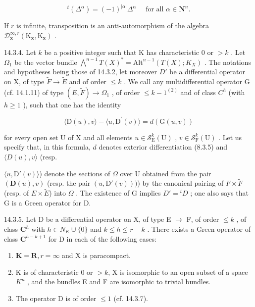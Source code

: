 \[
{ } ^ { t } ( \Delta ^ { \alpha } ) = ( - 1 ) ^ { | \alpha | } \Delta ^ { \alpha } \quad \text { for all } \alpha \in \mathbf {N} ^ { n } .
\]

If \(r\) is infinite, transposition is an anti-automorphism of the algebra \(\mathcal{D}_{\mathbf{x}}^{\infty,r}(\mathrm{K}_{\mathbf{x}},\mathrm{K}_{\mathbf{x}})\) .

14.3.4. Let \(k\) be a positive integer such that K has characteristic 0 or \(>k\) . Let \(\Omega_{1}\) be the vector bundle \(\bigwedge^{n-1}T(X)^{*} = \text{Alt}^{n-1}(T(X); K_{X})\) . The notations and hypotheses being those of 14.3.2, let moreover \(D'\) be a differential operator on X, of type \(\widetilde{F} \to \widetilde{E}\) and of order \(\leqslant k\) . We call any multidifferential operator G (cf. 14.1.11) of type \((E, \widetilde{F}) \to \Omega_{1}\) , of order \(\leqslant k - 1^{(2)}\) and of class \(C^{h}\) (with \(h \geqslant 1\) ), such that one has the identity

\[
\langle \mathrm{D} (u), v \rangle - \langle u, \mathrm{D} ^ {\prime} (v) \rangle = d (\mathrm{G} (u, v))\tag{1}
\]

for every open set U of X and all elements \(u \in \mathcal{S}_{\mathrm{E}}^{k}(\mathrm{U})\) , \(v \in \mathcal{S}_{\mathrm{F}}^{k}(\mathrm{U})\) . Let us specify that, in this formula, \(d\) denotes exterior differentiation (8.3.5) and \(\langle D(u), v \rangle\) (resp.

\(\langle u, \mathrm{D}'(v) \rangle\)) denote the sections of \(\Omega\) over U obtained from the pair \((\mathbf{D}(u), v)\) (resp. the pair \((u, \mathrm{D}'(v)))\)) by the canonical pairing of \(F \times \tilde{F}\) (resp. of \(E \times \tilde{E}\)) into \(\Omega\) . The existence of G implies \(D' = {}^t D\) ; one also says that G is a Green operator for D.

14.3.5. Let D be a differential operator on X, of type E \(\to\) F, of order \(\leqslant k\) , of class \(\mathbf{C}^{h}\) with \(h \in N_{K} \cup \{0\}\) and \(k \leqslant h \leqslant r-k\) . There exists a Green operator of class \(\mathbf{C}^{h-k+1}\) for D in each of the following cases:

\begin{enumerate}
\def\labelenumi{\alph{enumi})}
\item
  \(\mathbf{K} = \mathbf{R}, r = \infty\) and X is paracompact.
\item
  K is of characteristic 0 or \(>k\), X is isomorphic to an open subset of a space \(K^{n}\) , and the bundles E and F are isomorphic to trivial bundles.
\item
  The operator D is of order \(\leqslant1\) (cf. 14.3.7).
\end{enumerate}

